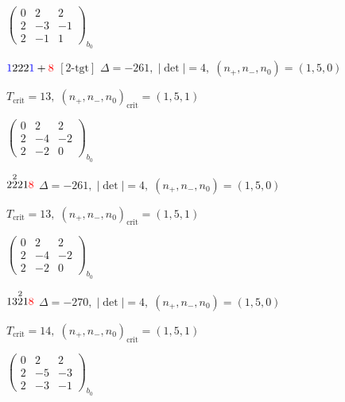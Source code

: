 \documentclass[10pt]{article}
\begin{document}
\hspace{2em}$\left(\begin{smallmatrix}0 & 2 & 2 \\ 2 & -3 & -1 \\ 2 & -1 & 1\end{smallmatrix}\right)_{\!b_0}$

$\textcolor{blue}{1}222\textcolor{blue}{1}+\textcolor{red}{8}$ $\scriptstyle [2\text{-tgt}]$ \quad $\Delta=-261,\; |\det|=4,\; (n_+,n_-,n_0)=(1,5,0)$

\hspace{1em}$T_{\text{crit}}=13,\; (n_+,n_-,n_0)_{\text{crit}}=(1,5,1)$

\hspace{2em}$\left(\begin{smallmatrix}0 & 2 & 2 \\ 2 & -4 & -2 \\ 2 & -2 & 0\end{smallmatrix}\right)_{\!b_0}$

\smallskip

$2\overset{2}{2}21\textcolor{red}{8}$ \quad $\Delta=-261,\; |\det|=4,\; (n_+,n_-,n_0)=(1,5,0)$

\hspace{1em}$T_{\text{crit}}=13,\; (n_+,n_-,n_0)_{\text{crit}}=(1,5,1)$

\hspace{2em}$\left(\begin{smallmatrix}0 & 2 & 2 \\ 2 & -4 & -2 \\ 2 & -2 & 0\end{smallmatrix}\right)_{\!b_0}$

\smallskip

$13\overset{2}{2}1\textcolor{red}{8}$ \quad $\Delta=-270,\; |\det|=4,\; (n_+,n_-,n_0)=(1,5,0)$

\hspace{1em}$T_{\text{crit}}=14,\; (n_+,n_-,n_0)_{\text{crit}}=(1,5,1)$

\hspace{2em}$\left(\begin{smallmatrix}0 & 2 & 2 \\ 2 & -5 & -3 \\ 2 & -3 & -1\end{smallmatrix}\right)_{\!b_0}$

\smallskip
\end{document}
